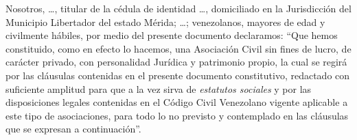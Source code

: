 Nosotros, \ldots, titular de la c\'edula de identidad \textnumero \ldots,
domiciliado en la Jurisdicci\'on del Municipio Libertador del estado M\'erida;
\ldots; venezolanos, mayores de edad y civilmente h\'abiles, por medio del
presente documento declaramos: ``Que hemos constituido, como en efecto lo
hacemos, una Asociaci\'on Civil sin fines de lucro, de car\'acter privado, con
personalidad Jur\'i{}dica y patrimonio propio, la cual se regir\'a por las
cl\'ausulas contenidas en el presente documento constitutivo, redactado con
suficiente amplitud para que a la vez sirva de \emph{estatutos sociales} y por
las disposiciones legales contenidas en el C\'odigo Civil Venezolano vigente
aplicable a este tipo de asociaciones, para todo lo no previsto y contemplado en
las cl\'ausulas que se expresan a continuaci\'on''.
